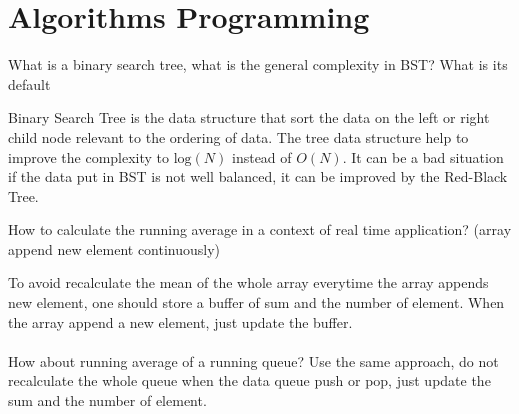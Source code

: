 \documentclass[answers]{exam}
\newcommand*{\ANCOAALGO}{}%
\begin{document}
\ifdefined\ANCOAALGO
\newpage
\section{Algorithms Programming}
\begin{questions}

\question What is a binary search tree, what is the general complexity in BST? What is its default
\begin{solution}[.2in]
Binary Search Tree is the data structure that sort the data on the left or right child node relevant to the ordering of data. The tree data structure help to improve the complexity to $\text{log}(N)$ instead of $O(N)$. It can be a bad situation if the data put in BST is not well balanced, it can be improved by the Red-Black Tree.
\end{solution}

\question How to calculate the running average in a context of real time application? (array append new element continuously)
\begin{solution}[.2in]
	To avoid recalculate the mean of the whole array everytime the array appends new element, one should store a buffer of sum and the number of element. When the array append a new element, just update the buffer.
	\paragraph{} How about running average of a running queue? Use the same approach, do not recalculate the whole queue when the data queue push or pop, just update the sum and the number of element.
\end{solution}


\end{questions}
\end{document}
